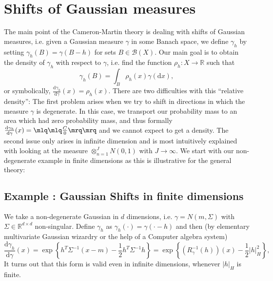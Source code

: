 \documentclass{scrartcl}
\theoremstyle{definition}
\theoremstyle{remark}
\newcommand{\de}{\mathrm d}
\newcommand{\R}{\mathbb R}
\newcommand*\circled[1]{\tikz[baseline=(char.base)]{
            \node[shape=circle,draw,inner sep=2pt] (char) {#1};}}
\DeclareRobustCommand{\myboxtwo}[2][blue!20]{%
\begin{tcolorbox}[   %
        breakable,
        left=0pt,
        right=0pt,
        top=0pt,
        bottom=0pt,
        colback=#1,
        colframe=#1,
        width=\dimexpr\textwidth\relax, 
        enlarge left by=0mm,
        boxsep=5pt,
        arc=10pt,outer arc=10pt,
        ]
        #2
\end{tcolorbox}
}
\begin{document}
\section{Shifts of Gaussian measures}
The main point of the Cameron-Martin theory is dealing with shifts of Gaussian measures, i.e. given a Gaussian measure $\gamma$ in some Banach space, we define $\gamma_h$ by setting $\gamma_h(B) = \gamma(B-h)$ for sets $B\in \mathcal B(X)$. Our main goal is to obtain the density of $\gamma_h$ with respect to $\gamma$, i.e. find the function $\rho_h: X\to \R$ such that 
\[\gamma_h(B) = \int_B \rho_h(x) \gamma(\de x),\]
or symbolically, $\frac{\de \gamma_h}{\de \gamma}(x) = \rho_h(x)$.
 There are two difficulties with this ``relative density'': The first problem arises when we try to shift in directions in which the measure $\gamma$ is degenerate. In this case, we transport our probability mass to an area which had zero probability mass, and thus formally $\frac{\de \gamma_h}{\de \gamma}(x) = \mlq\mlq\frac{C}{0}\mrq\mrq$ and we cannot expect to get a density. 
 The second issue only arises in infinite dimension and is most intuitively explained with looking at the measure $\otimes_{n=1}^J N(0,1)$ with $J\to \infty$.
 We start with our non-degenerate example in finite dimensions as this is illustrative for the general theory:
\myboxtwo{
\subsection*{Example \circled{1}: Gaussian Shifts in finite dimensions}
We take a non-degenerate Gaussian in $d$ dimensions, i.e. $\gamma = N(m, \Sigma)$ with $\Sigma\in \R^{d\times d}$ non-singular. Define $\gamma_h$ as $\gamma_h(\cdot) = \gamma(\cdot - h)$ and then (by elementary multivariate Gaussian wizardry or the help of a Computer algebra system)
\begin{displaymath}
\frac{\de \gamma_h}{\de \gamma}(x) = \exp\left\{h^T\Sigma^{-1}(x-m) - \frac{1}{2}h^T\Sigma^{-1}h\right\} = \exp\left\{(R_\gamma^{-1}(h))(x) - \frac{1}{2}|h|_H^2\right\},
\end{displaymath}
It turns out that this form is valid even in infinite dimensions, whenever $|h|_H$ is finite.
} 
\end{document}
